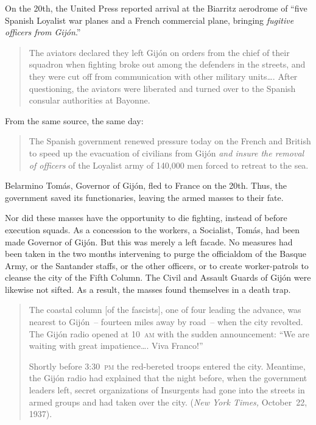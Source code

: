 On the 20th, the United Press reported arrival at the Biarritz aerodrome of ``five Spanish Loyalist war planes and a French commercial plane, bringing \emph{fugitive officers from Gij\'on}.'' 

\begin{quotation}
  The aviators declared they left Gij\'on on orders from the chief of their squadron when fighting broke out among the defenders in the streets, and they were cut off from communication with other military units\dots. After questioning, the aviators were liberated and turned over to the Spanish consular authorities at Bayonne.
\end{quotation}

From the same source, the same day:

\begin{quotation}
  The Spanish government renewed pressure today on the French and British to speed up the evacuation of civilians from Gij\'on \emph{and insure the removal of officers} of the Loyalist army of 140,000 men forced to retreat to the sea.
\end{quotation}

Belarmino Tom\'as, Governor of Gij\'on, fled to France on the 20th. Thus, the government saved its functionaries, leaving the armed masses to their fate.

Nor did these masses have the opportunity to die fighting, instead of before execution squads. As a concession to the workers, a Socialist, Tom\'as, had been made Governor of Gij\'on. But this was merely a left facade. No measures had been taken in the two months intervening to purge the officialdom of the Basque Army, or the Santander staffs, or the other officers, or to create worker-patrols to cleanse the city of the Fifth Column. The Civil and Assault Guards of Gij\'on were likewise not sifted. As a result, the masses found themselves in a death trap.

\begin{quotation}
  The coastal column [of the fascists], one of four leading the advance, was nearest to Gij\'on~– fourteen miles away by road~– when the city revolted. The Gij\'on radio opened at 10~\textsc{am} with the sudden announcement: ``We are waiting with great impatience\dots. Viva Franco!''
  
  Shortly before 3:30~\textsc{pm} the red-bereted troops entered the city. Meantime, the Gij\'on radio had explained that the night before, when the government leaders left, secret organizations of Insurgents had gone into the streets in armed groups and had taken over the city. (\emph{New York Times,} October~22, 1937).
\end{quotation}

